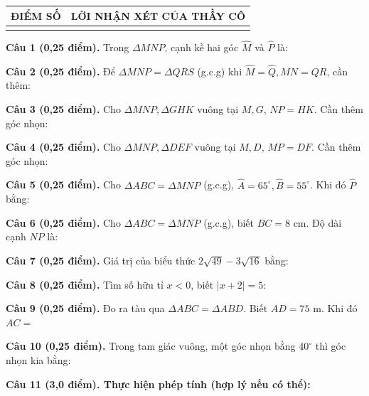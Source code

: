 \documentclass[12pt,a4paper]{article}
\begin{document}
\vspace{1.0mm}

\noindent
\begin{tabularx}{\linewidth}{|p{3.2cm}|X|}
\hline
\centering\textbf{ĐIỂM SỐ} & \centering\textbf{LỜI NHẬN XÉT CỦA THẦY CÔ} \tabularnewline
\hline
\rule{0pt}{1.8cm} & \tabularnewline
\hline
\end{tabularx}

\vspace{1.2mm}
\noindent\textbf{Câu 1 (0,25 điểm).} Trong $\Delta MNP$, cạnh kề hai góc $\widehat{M}$ và $\widehat{P}$ là: \par\vspace{3.0mm}
\noindent\textbf{Câu 2 (0,25 điểm).} Để $\Delta MNP = \Delta QRS$ (g.c.g) khi $\widehat{M}=\widehat{Q}, MN=QR$, cần thêm: \par\vspace{3.0mm}
\noindent\textbf{Câu 3 (0,25 điểm).} Cho $\Delta MNP, \Delta GHK$ vuông tại $M, G$, $NP=HK$. Cần thêm góc nhọn: \par\vspace{3.0mm}
\noindent\textbf{Câu 4 (0,25 điểm).} Cho $\Delta MNP, \Delta DEF$ vuông tại $M, D$, $MP=DF$. Cần thêm góc nhọn: \par\vspace{3.0mm}
\noindent\textbf{Câu 5 (0,25 điểm).} Cho $\Delta ABC = \Delta MNP$ (g.c.g), $\widehat{A}=65^\circ, \widehat{B}=55^\circ$. Khi đó $\widehat{P}$ bằng: \par\vspace{3.0mm}
\noindent\textbf{Câu 6 (0,25 điểm).} Cho $\Delta ABC = \Delta MNP$ (g.c.g), biết $BC = 8\text{ cm}$. Độ dài cạnh $NP$ là: \par\vspace{3.0mm}
\noindent\textbf{Câu 7 (0,25 điểm).} Giá trị của biểu thức $2\sqrt{49} - 3\sqrt{16}$ bằng: \par\vspace{3.0mm}
\noindent\textbf{Câu 8 (0,25 điểm).} Tìm số hữu tỉ $x < 0$, biết $|x + 2| = 5$: \par\vspace{3.0mm}
\noindent\textbf{Câu 9 (0,25 điểm).} Đo ra tàu qua $\Delta ABC = \Delta ABD$. Biết $AD = 75\text{ m}$. Khi đó $AC = $ \par\vspace{3.0mm}
\noindent\textbf{Câu 10 (0,25 điểm).} Trong tam giác vuông, một góc nhọn bằng $40^\circ$ thì góc nhọn kia bằng: \par\vspace{3.0mm}
\vspace{0.2mm}
\noindent\textbf{Câu 11 (3,0 điểm). Thực hiện phép tính (hợp lý nếu có thể):}
\vspace{0.6mm}
\end{document}
